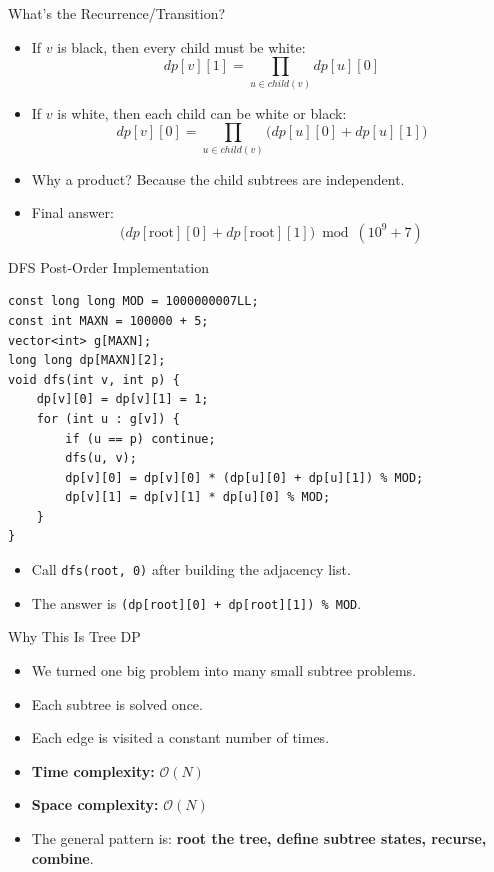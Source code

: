 \documentclass{beamer}
\begin{document}
\begin{frame}{What's the Recurrence/Transition?}
    \begin{itemize}
        \item If \(v\) is black, then every child must be white:
        \[
            dp[v][1] = \prod_{u \in child(v)} dp[u][0]
        \]
        \item If \(v\) is white, then each child can be white or black:
        \[
            dp[v][0] = \prod_{u \in child(v)} \bigl(dp[u][0] + dp[u][1]\bigr)
        \]
        \item Why a product? Because the child subtrees are independent.
        \item Final answer:
        $$\bigl(dp[\text{root}][0] + dp[\text{root}][1]\bigr)\bmod (10^9+7)$$
    \end{itemize}
\end{frame}

\begin{frame}[fragile]{DFS Post-Order Implementation}
\begin{Verbatim}[fontsize=\small]
const long long MOD = 1000000007LL;
const int MAXN = 100000 + 5;
vector<int> g[MAXN];
long long dp[MAXN][2];
void dfs(int v, int p) {
    dp[v][0] = dp[v][1] = 1;
    for (int u : g[v]) {
        if (u == p) continue;
        dfs(u, v);
        dp[v][0] = dp[v][0] * (dp[u][0] + dp[u][1]) % MOD;
        dp[v][1] = dp[v][1] * dp[u][0] % MOD;
    }
}
\end{Verbatim}

    \begin{itemize}
        \item Call \texttt{dfs(root, 0)} after building the adjacency list.
        \item The answer is \texttt{(dp[root][0] + dp[root][1]) \% MOD}.
    \end{itemize}
\end{frame}

\begin{frame}{Why This Is Tree DP}
    \begin{itemize}
        \item We turned one big problem into many small subtree problems.
        \item Each subtree is solved once.
        \item Each edge is visited a constant number of times.
        \item \textbf{Time complexity:} \(\mathcal{O}(N)\)
        \item \textbf{Space complexity:} \(\mathcal{O}(N)\)
        \item The general pattern is: \textbf{root the tree, define subtree states, recurse, combine}.
    \end{itemize}
\end{frame}
\end{document}
